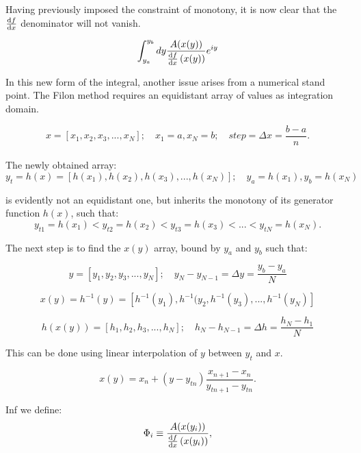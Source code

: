 Having previously imposed the constraint of monotony, it is now clear that the $\dv{f}{x}$ denominator will not vanish.

\begin{equation}
    \int_{y_a}^{y_b}dy\frac{A(x(y))}{\dv{f}{x}\left(x(y)\right)}e^{iy}
\end{equation}

In this new form of the integral, another issue arises from a numerical stand point. 
The Filon method requires an equidistant array of values as integration domain.

\begin{equation}
    x = [x_1, x_2, x_3, ..., x_N]; \quad x_1 = a, x_N = b; \quad step = \Delta x = \frac{b-a}{n}. 
\end{equation}\\

The newly obtained array: 
\begin{equation}
    y_t=h(x)=[h(x_1),h(x_2),h(x_3), ..., h(x_N)]; \quad y_a=h(x_1), y_b=h(x_N) 
\end{equation}

is evidently not an equidistant one, but inherits the monotony of its generator function $h(x)$, such that:
$$
    y_{t1}=h(x_1) < y_{t2}=h(x_2) < y_{t3}=h(x_3) < ... < y_{tN}=h(x_N).
$$

The next step is to find the $x(y)$ array, bound by $y_a$ and $y_b$ such that:

\begin{equation}
        y = [y_1, y_2, y_3, ..., y_N]; \quad y_N-y_{N-1}=\Delta y = \frac{y_b-y_a}{N} 
\end{equation}

\begin{equation}
    x(y)=h^{-1}(y)=[h^{-1}(y_1), h^{-1}(y_2, h^{-1}(y_3), ...,h^{-1}(y_N)] 
\end{equation}

\begin{equation}
    h(x(y)) = [h_1,h_2,h_3, ..., h_N];\quad h_N-h_{N-1}=\Delta h = \frac{h_N-h_1}{N} 
\end{equation}

This can be done using linear interpolation of $y$ between $y_t$ and $x$.

\begin{equation}
    x(y)=x_n+(y-y_{tn})\frac{x_{n+1}-x_n}{y_{tn+1}-y_{tn}}.
\end{equation}

Inf we define:
\begin{equation}
    \Phi_i \equiv \frac{A(x(y_i))}{\dv{f}{x}\left(x(y_i)\right)},
\end{equation}

